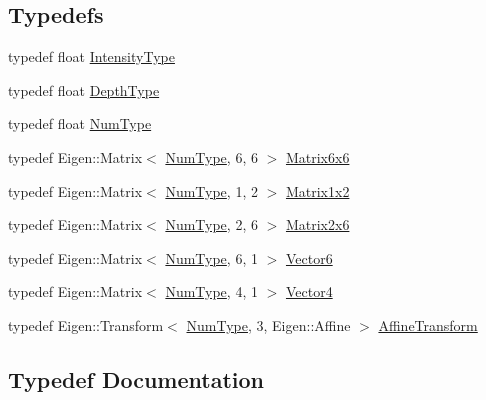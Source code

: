 \subsection*{Typedefs}
\begin{DoxyCompactItemize}
\item 
typedef float \mbox{\hyperlink{namespacedvo_1_1core_a59740d7c1f271a6ec8cb2b5c42e7a3f2}{Intensity\+Type}}
\item 
typedef float \mbox{\hyperlink{namespacedvo_1_1core_a565534fff2ff821328d2df63f7bf1260}{Depth\+Type}}
\item 
typedef float \mbox{\hyperlink{namespacedvo_1_1core_ab9c199d221775a923e2549ad7e15c323}{Num\+Type}}
\item 
typedef Eigen\+::\+Matrix$<$ \mbox{\hyperlink{namespacedvo_1_1core_ab9c199d221775a923e2549ad7e15c323}{Num\+Type}}, 6, 6 $>$ \mbox{\hyperlink{namespacedvo_1_1core_a7b76cdc563f01ec2220fd58316004626}{Matrix6x6}}
\item 
typedef Eigen\+::\+Matrix$<$ \mbox{\hyperlink{namespacedvo_1_1core_ab9c199d221775a923e2549ad7e15c323}{Num\+Type}}, 1, 2 $>$ \mbox{\hyperlink{namespacedvo_1_1core_a1b2eef131d3b6ff8d3733810a89c9b98}{Matrix1x2}}
\item 
typedef Eigen\+::\+Matrix$<$ \mbox{\hyperlink{namespacedvo_1_1core_ab9c199d221775a923e2549ad7e15c323}{Num\+Type}}, 2, 6 $>$ \mbox{\hyperlink{namespacedvo_1_1core_ac6a9bb149a44f85a33be52a701abfac8}{Matrix2x6}}
\item 
typedef Eigen\+::\+Matrix$<$ \mbox{\hyperlink{namespacedvo_1_1core_ab9c199d221775a923e2549ad7e15c323}{Num\+Type}}, 6, 1 $>$ \mbox{\hyperlink{namespacedvo_1_1core_a05327f3312d32a301bce9fccda9e5807}{Vector6}}
\item 
typedef Eigen\+::\+Matrix$<$ \mbox{\hyperlink{namespacedvo_1_1core_ab9c199d221775a923e2549ad7e15c323}{Num\+Type}}, 4, 1 $>$ \mbox{\hyperlink{namespacedvo_1_1core_a71fd2291c4d15b2a797ec3a0959d2b6a}{Vector4}}
\item 
typedef Eigen\+::\+Transform$<$ \mbox{\hyperlink{namespacedvo_1_1core_ab9c199d221775a923e2549ad7e15c323}{Num\+Type}}, 3, Eigen\+::\+Affine $>$ \mbox{\hyperlink{namespacedvo_1_1core_af89a8f837f3ae51ed196b7988e59e53d}{Affine\+Transform}}
\end{DoxyCompactItemize}


\subsection{Typedef Documentation}
\mbox{\label{namespacedvo_1_1core_af89a8f837f3ae51ed196b7988e59e53d}} 
